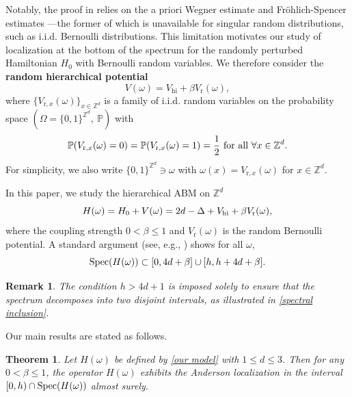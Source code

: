 \documentclass[11pt,reqno,UTF8,twoside]{amsart}
\newcommand{\Z}{\mathbb{Z}}
\newcommand{\spec}{{\rm Spec}}
\renewcommand{\P}{\mathbb{P}}
\newtheorem{thm}{Theorem}[section]
\newtheorem{rmk}{\bf Remark}[section]
\theoremstyle{definition}
\numberwithin{equation}{section}
\begin{document}
Notably, the proof in \cite{JLMS85} relies on the a priori Wegner estimate and Fröhlich-Spencer estimates \cite{FS83}—the former of which is unavailable for singular random distributions, such as i.i.d. Bernoulli distributions. This limitation motivates our study of localization at the bottom of the spectrum for the randomly perturbed Hamiltonian $H_0$ with Bernoulli random variables. We therefore consider the \textbf{random hierarchical potential}\begin{equation}\label{random hierarchical potential}
V(\omega) = V_{\text{hi}} + \beta V_{\text{r}}(\omega),
\end{equation}
where  $\{V_{\text{r}, x}(\omega)\}_{x \in \mathbb{Z}^d}$ is a family of  i.i.d.  random variables on   the  probability space $\left(\Omega=\{0,1\}^{\Z^d}, \  \mathbb{P}\right)$ with 
\begin{equation}\label{Bernoulli distribution}
  \P(V_{\text{r},x}(\omega)=0)=\P(V_{\text{r},x}(\omega)=1)=\frac{1}{2}\ {\rm for\ all}\ \forall x\in \Z^d.
\end{equation}
For simplicity, we also write   $\{0,1\}^{\Z^d}\ni\omega$ with $\omega(x)=V_{\text{r}, x}(\omega)$  for $x\in \Z^d$.    


In this paper, we study the  hierarchical ABM on $\Z^d$ 
\begin{equation}\label{our model}
	H(\omega)=H_0+V(\omega)=2d-\Delta +V_{\rm hi}+\beta V_{\text{r}}(\omega),
\end{equation}
where the  coupling strength $0<\beta\leq 1$ and $V_{\text{r}}(\omega)$ is the random Bernoulli potential. 
A  standard argument (see, e.g., \cite[Lemma 2.1.2]{Kri08}) shows for all $\omega$, 
\begin{equation}\label{spectral inclusion}
  \spec(H(\omega)) \subset [0,4d+\beta]\cup [h,h+4d+\beta]. 
\end{equation} 
\begin{rmk}
The condition $h>4d+1$ is imposed solely to ensure that the spectrum decomposes into two disjoint intervals, as illustrated in \eqref{spectral inclusion}.
\end{rmk}

Our main results are stated as follows.

\begin{thm}\label{low dimension localization}  Let $H(\omega)$ be defined by \eqref{our model} with  $1\leq d \leq 3$. Then for any $0 < \beta \leq 1$, the operator $H(\omega)$ exhibits the Anderson localization in the interval $[0, h) \cap \spec(H(\omega))$ almost surely.
\end{thm}
\end{document}
